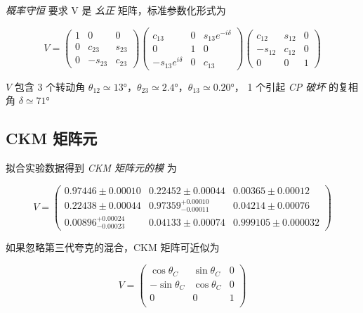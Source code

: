 \emph{概率守恒} 要求 V 是 \emph{幺正} 矩阵，标准参数化形式为

\begin{equation}
    V = \begin{pmatrix}
        1 & 0 & 0 \\
        0 & c_{23} & s_{23} \\
        0 & -s_{23} & c_{23}
    \end{pmatrix}
    \begin{pmatrix}
        c_{13} & 0 & s_{13} e^{-i\delta} \\
        0 & 1 & 0 \\
        -s_{13} e^{i\delta} & 0 & c_{13}
    \end{pmatrix}
    \begin{pmatrix}
        c_{12} & s_{12} & 0 \\
        -s_{12} & c_{12} & 0 \\
        0 & 0 & 1
    \end{pmatrix}
\end{equation}

$V$ 包含 3 个转动角 $\theta_{12} \simeq \ang{13}$，$\theta_{23} \simeq \ang{2.4}$，$\theta_{13} \simeq \ang{0.20}$， 1 个引起 \emph{CP 破坏} 的复相角 $\delta \simeq \ang{71}$

\subsection{CKM 矩阵元}

拟合实验数据得到 \emph{CKM 矩阵元的模} 为

\begin{equation}
    V =
    \begin{pmatrix}
        0.97446 \pm 0.00010 & 0.22452 \pm 0.00044 & 0.00365 \pm 0.00012 \\
        0.22438 \pm 0.00044 & 0.97359^{+0.00010}_{-0.00011} & 0.04214 \pm 0.00076 \\
        0.00896^{+0.00024}_{-0.00023} & 0.04133 \pm 0.00074 & 0.999105 \pm 0.000032
    \end{pmatrix}
\end{equation}

如果忽略第三代夸克的混合，CKM 矩阵可近似为

\begin{equation}
    V =
    \begin{pmatrix}
        \cos \theta_C & \sin \theta_C & 0 \\
        -\sin \theta_C & \cos \theta_C & 0 \\
        0 & 0 & 1 \\
    \end{pmatrix}
\end{equation}

